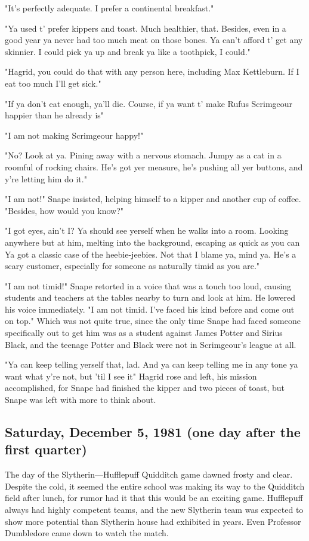 "It's perfectly adequate. I prefer a continental breakfast."

"Ya used t' prefer kippers and toast. Much healthier, that. Besides, even in a good year ya never had too much meat on those bones. Ya can't afford t' get any skinnier. I could pick ya up and break ya like a toothpick, I could."

"Hagrid, you could do that with any person here, including Max Kettleburn. If I eat too much I'll get sick."

"If ya don't eat enough, ya'll die. Course, if ya want t' make Rufus Scrimgeour happier than he already is{\el}"

"I am not making Scrimgeour happy!"

"No? Look at ya. Pining away with a nervous stomach. Jumpy as a cat in a roomful of rocking chairs. He's got yer measure, he's pushing all yer buttons, and y're letting him do it."

"I am not!" Snape insisted, helping himself to a kipper and another cup of coffee. "Besides, how would you know?"

"I got eyes, ain't I? Ya should see yerself when he walks into a room. Looking anywhere but at him, melting into the background, escaping as quick as you can{\el} Ya got a classic case of the heebie-jeebies. Not that I blame ya, mind ya. He's a scary customer, especially for someone as naturally timid as you are."

"I am not timid!" Snape retorted in a voice that was a touch too loud, causing students and teachers at the tables nearby to turn and look at him. He lowered his voice immediately. "I am not timid. I've faced his kind before and come out on top." Which was not quite true, since the only time Snape had faced someone specifically out to get him was as a student against James Potter and Sirius Black, and the teenage Potter and Black were not in Scrimgeour's league at all.

"Ya can keep telling yerself that, lad. And ya can keep telling me in any tone ya want what y're not, but 'til I see it{\el}" Hagrid rose and left, his mission accomplished, for Snape had finished the kipper and two pieces of toast, but Snape was left with more to think about.

\subsection{Saturday, December 5, 1981 (one day after the first quarter)}

The day of the Slytherin—Hufflepuff Quidditch game dawned frosty and clear. Despite the cold, it seemed the entire school was making its way to the Quidditch field after lunch, for rumor had it that this would be an exciting game. Hufflepuff always had highly competent teams, and the new Slytherin team was expected to show more potential than Slytherin house had exhibited in years. Even Professor Dumbledore came down to watch the match.

